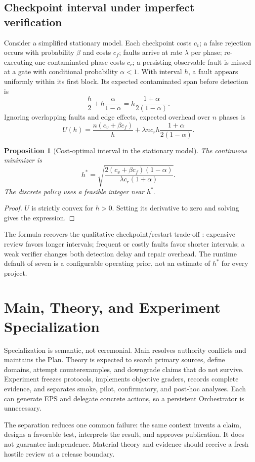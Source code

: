 \documentclass[11pt]{article}
\newtheorem{proposition}[definition]{Proposition}
\begin{document}
\subsection{Checkpoint interval under imperfect verification}
Consider a simplified stationary model. Each checkpoint costs $c_v$; a false rejection occurs with probability $\beta$ and costs $c_f$; faults arrive at rate $\lambda$ per phase; re-executing one contaminated phase costs $c_r$; a persisting observable fault is missed at a gate with conditional probability $\alpha<1$. With interval $h$, a fault appears uniformly within its first block. Its expected contaminated span before detection is
\[
\frac h2+h\frac{\alpha}{1-\alpha}=h\frac{1+\alpha}{2(1-\alpha)}.
\]
Ignoring overlapping faults and edge effects, expected overhead over $n$ phases is
\[
U(h)=\frac{n(c_v+\beta c_f)}{h}+\lambda n c_r h\frac{1+\alpha}{2(1-\alpha)}.
\]
\begin{proposition}[Cost-optimal interval in the stationary model]
\label{prop:hstar}
The continuous minimizer is
\[
h^*=\sqrt{\frac{2(c_v+\beta c_f)(1-\alpha)}{\lambda c_r(1+\alpha)}}.
\]
The discrete policy uses a feasible integer near $h^*$.
\end{proposition}
\begin{proof}
$U$ is strictly convex for $h>0$. Setting its derivative to zero and solving gives the expression.
\end{proof}
The formula recovers the qualitative checkpoint/restart trade-off \citep{young1974first,daly2006higher}: expensive review favors longer intervals; frequent or costly faults favor shorter intervals; a weak verifier changes both detection delay and repair overhead. The runtime default of seven is a configurable operating prior, not an estimate of $h^*$ for every project.

\section{Main, Theory, and Experiment Specialization}
Specialization is semantic, not ceremonial. Main resolves authority conflicts and maintains the Plan. Theory is expected to search primary sources, define domains, attempt counterexamples, and downgrade claims that do not survive. Experiment freezes protocols, implements objective graders, records complete evidence, and separates smoke, pilot, confirmatory, and post-hoc analyses. Each can generate EPS and delegate concrete actions, so a persistent Orchestrator is unnecessary.

The separation reduces one common failure: the same context invents a claim, designs a favorable test, interprets the result, and approves publication. It does not guarantee independence. Material theory and evidence should receive a fresh hostile review at a release boundary.
\end{document}
